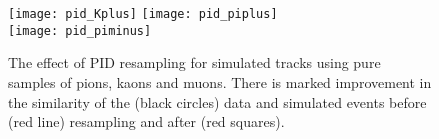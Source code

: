 \begin{figure}
  \begin{center}
    \texttt{[image: pid\_Kplus]}
    \texttt{[image: pid\_piplus]}\\
    \texttt{[image: pid\_piminus]}
    \caption{\small
      The effect of PID resampling for simulated tracks using pure samples of pions, kaons and
      muons.
      There is marked improvement in the similarity of the (black circles) \btojpsikpipi data and
      simulated events before (red line) resampling and after (red squares).
    }
    \label{fig:hhh:pid}
  \end{center}
\end{figure}
















